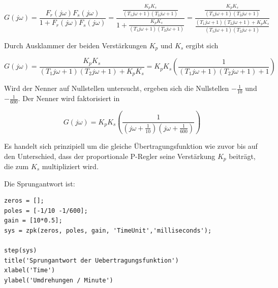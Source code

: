 \documentclass[            %
draft = false,             		%
paper = A4,                		%
pagesize = pdftex,         		%
fontsize = 10pt,           		%
DIV=15,                    		%
twoside = false,           		%
twocolumn = false,         		%
parskip = full,           		%
chapterprefix = false,      		%
appendixprefix = true,     		%
headinclude = false,       		%
footinclude = false,       		%
mpinclude = false,         		%
numbers = auto,            		%
cleardoublepage = plain,   		%
footnotes = multiple,      		%
titlepage = true,          		%
headings = normal,         		%
open = right,              		%
bibliography = openstyle,  		%
listof = chaptergapline,   		%
overfullrule = true,
]{scrbook}
\begin{document}
\begin{equation}
G(j\omega) = \frac{F_r(j\omega)F_s(j\omega)}{1 + F_r(j\omega)F_s(j\omega)} = \frac{\frac{K_{p}K_{s}}{(T_{1}j\omega + 1)(T_{2}j\omega + 1)}}{1 + \frac{K_{p}K_{s}}{(T_{1}j\omega + 1)(T_{2}j\omega + 1)}}
= \frac{\frac{K_{p}K_{s}}{(T_{1}j\omega + 1)(T_{2}j\omega + 1)}}{\frac{(T_{1}j\omega + 1)(T_{2}j\omega + 1) + K_{p}K_{s}}{(T_{1}j\omega + 1)(T_{2}j\omega + 1)}}
\end{equation}

Durch Ausklammer der beiden Verstärkungen $K_{p}$ und $K_{s}$ ergibt sich

\begin{equation}
G(j\omega) = \frac{K_{p}K_{s}}{(T_{1}j\omega + 1)(T_{2}j\omega + 1) + K_{p}K_{s}} = K_{p}K_{s}(\frac{1}{(T_{1}j\omega + 1)(T_{2}j\omega + 1) + 1})
\end{equation}

Wird der Nenner auf Nullstellen untersucht, ergeben sich die Nullstellen $-\frac{1}{10}$ und $-\frac{1}{600}$. Der Nenner wird faktorisiert in

\begin{equation}
G(j\omega) = K_{p}K_{s}( \frac{1}{(j\omega + \frac{1}{10})(j\omega + \frac{1}{600})} )
\end{equation}

Es handelt sich prinzipiell um die gleiche Übertragungsfunktion wie zuvor bis auf den Unterschied, dass der proportionale P-Regler seine Verstärkung $K_{p}$ beiträgt,
die zum $K_{s}$ multipliziert wird.

Die Sprungantwort ist:

\begin{lstlisting}[style=CStyle]
zeros = [];
poles = [-1/10 -1/600];
gain = [10*0.5];
sys = zpk(zeros, poles, gain, 'TimeUnit','milliseconds');

step(sys)
title('Sprungantwort der Uebertragungsfunktion')
xlabel('Time') 
ylabel('Umdrehungen / Minute') 
\end{lstlisting}
\end{document}
